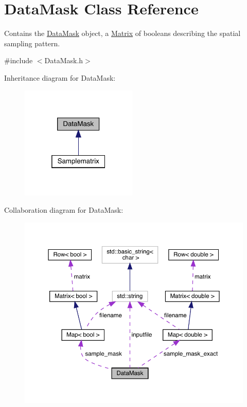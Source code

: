 \hypertarget{class_data_mask}{}\section{Data\+Mask Class Reference}
\label{class_data_mask}


Contains the \hyperlink{class_data_mask}{Data\+Mask} object, a \hyperlink{class_matrix}{Matrix} of booleans describing the spatial sampling pattern.  




{\ttfamily \#include $<$Data\+Mask.\+h$>$}



Inheritance diagram for Data\+Mask\+:
\nopagebreak
\begin{figure}[H]
\begin{center}
\leavevmode
\includegraphics[width=157pt]{class_data_mask__inherit__graph}
\end{center}
\end{figure}


Collaboration diagram for Data\+Mask\+:
\nopagebreak
\begin{figure}[H]
\begin{center}
\leavevmode
\includegraphics[width=350pt]{class_data_mask__coll__graph}
\end{center}
\end{figure}
